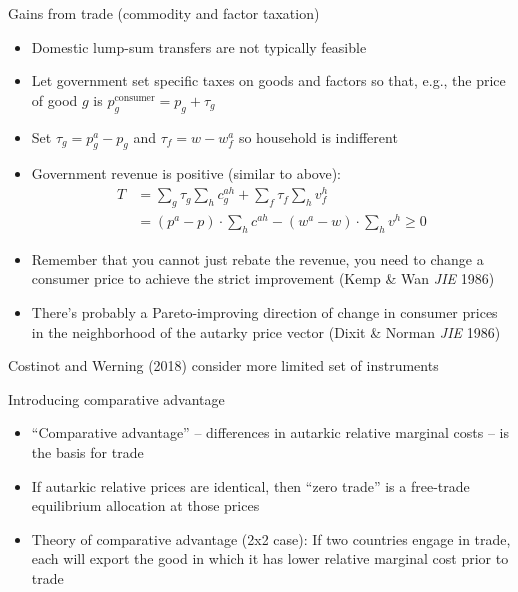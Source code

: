 \documentclass[10pt,notes=hide]{beamer}
\begin{document}
\begin{frame}{Gains from trade (commodity and factor taxation)}
\begin{itemize}
	\item Domestic lump-sum transfers are not typically feasible
	\item Let government set specific taxes on goods and factors so that, e.g., the price of good $g$ is $p_g^{\text{consumer}} = p_g + \tau_g$
	\item Set $\tau_g = p^a_g - p_g$ and $\tau_f = w - w^a_f$ so household is indifferent
	\item Government revenue is positive (similar to above):
	\begin{align*}
	T &= \sum\nolimits_g \tau_g \sum\nolimits_h c^{ah}_g + \sum\nolimits_f \tau_f \sum\nolimits_h v^h_f \\
	&= (p^a - p) \cdot \sum_h c^{ah} - (w^a - w) \cdot \sum_h v^h \geq 0
	\end{align*}
	\item Remember that you cannot just rebate the revenue, you need to change a consumer price to achieve the strict improvement (Kemp \& Wan \textit{JIE} 1986)
	\item There's probably a Pareto-improving direction of change in consumer prices in the neighborhood of the autarky price vector (Dixit \& Norman \textit{JIE} 1986)
\end{itemize}
{\footnotesize Costinot and Werning (2018) consider more limited set of instruments}
\end{frame}
\begin{frame}{Introducing comparative advantage}
\begin{itemize}
	\item ``Comparative advantage'' -- differences in autarkic relative marginal costs -- is the basis for trade
	\item If autarkic relative prices are identical, then ``zero trade'' is a free-trade equilibrium allocation at those prices
	\item Theory of comparative advantage (2x2 case): If two countries engage in trade, each will export the good in which it has lower relative marginal cost prior to trade
\end{itemize}
\end{frame}
\end{document}
